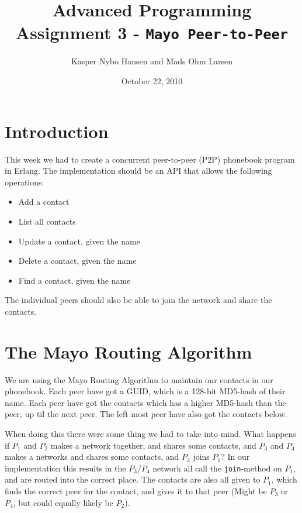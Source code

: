 \documentclass[10pt, a4paper]{article}
\title{Advanced Programming \\\small{Assignment 3} - \texttt{Mayo Peer-to-Peer}}
\author{Kasper Nybo Hansen and Mads Ohm Larsen}
\date{October 22, 2010}
\begin{document}
	
\maketitle

\section{Introduction} %
\label{sec:introduction}
This week we had to create a concurrent peer-to-peer (P2P) phonebook program in Erlang.
The implementation should be an API that allows the following operations:

\begin{itemize}
	\item Add a contact
	\item List all contacts
	\item Update a contact, given the name
	\item Delete a contact, given the name
	\item Find a contact, given the name
\end{itemize}

The individual peers should also be able to join the network and share the contacts.

\section{The Mayo Routing Algorithm} %
\label{sec:the_mayo_routing_algorithm}
We are using the Mayo Routing Algorithm to maintain our contacts in our phonebook.
Each peer have got a GUID, which is a 128-bit MD5-hash of their name.
Each peer have got the contacts which has a higher MD5-hash than the peer, up til the next peer.
The left most peer have also got the contacts below.

When doing this there were some thing we had to take into mind.
What happens if $P_1$ and $P_2$ makes a network together, and shares some contacts, and $P_3$ and $P_4$ makes a networks and shares some contacts, and $P_3$ joins $P_1$?
In our implementation this results in the $P_3$/$P_4$ network all call the \texttt{join}-method on $P_1$, and are routed into the correct place.
The contacts are also all given to $P_1$, which finds the correct peer for the contact, and gives it to that peer (Might be $P_3$ or $P_4$, but could equally likely be $P_2$).
\end{document}
